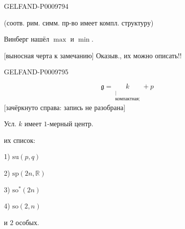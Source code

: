\begin{GelfandAdjacentEvidence}{GELFAND-P000979}{4}


(соотв. рим. симм. пр-во имеет компл. структуру)

Винберг нашёл $\max$ и $\min$.

[выносная черта к замечанию] Оказыв., их можно описать!!
\end{GelfandAdjacentEvidence}
\begin{GelfandAdjacentEvidence}{GELFAND-P000979}{5}


\[
 \mathfrak g=\underset{\substack{|\\\text{компактная;}}}{k}+p
\]
[зачёркнуто справа: запись не разобрана]
\end{GelfandAdjacentEvidence}


Усл. $k$ имеет $1$-мерный центр.

их список:

1) $\mathrm{su}(p,q)$

2) $\mathrm{sp}(2n,\mathbb R)$

3) $\mathrm{so}^*(2n)$

4) $\mathrm{so}(2,n)$

и $2$ особых.

